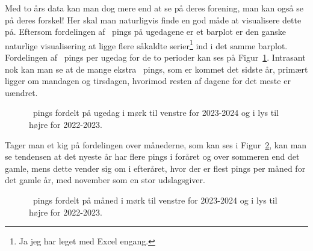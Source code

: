 \begin{article}
Med to års data kan man dog mere end at se på deres forening, man kan også se på deres forskel!
Her skal man naturligvis finde en god måde at visualisere dette på. Eftersom fordelingen af \coffee\ pings på ugedagene er et barplot er den ganske naturlige visualisering at ligge flere såkaldte serier\footnote{Ja jeg har leget med Excel engang.} ind i det samme barplot. Fordelingen af \coffee\ pings per ugedag for de to perioder kan ses på Figur~\ref{fig:weekday_analysis_side_by_side_2022-2023_2023-2024}. Intrasant nok kan man se at de mange ekstra \coffee\ pings, som er kommet det sidste år, primært ligger om mandagen og tirsdagen, hvorimod resten af dagene for det meste er uændret.

\begin{figure}[H]
	\centering
	\resizebox{\columnwidth}{!}{}
	\vspace{-25pt}
	\caption{\protect\coffee\ pings fordelt på ugedag i mørk til venstre for 2023-2024 og i lys til højre for 2022-2023.}
	\label{fig:weekday_analysis_side_by_side_2022-2023_2023-2024}
\end{figure}

Tager man et kig på fordelingen over månederne, som kan ses i Figur~\ref{fig:month_analysis_side_by_side_2022-2023_2023-2024}, kan man se tendensen at det nyeste år har flere pings i foråret og over sommeren end det gamle, mens dette vender sig om i efteråret, hvor der er flest pings per måned for det gamle år, med november som en stor udslagsgiver.

\begin{figure}[H]
	\centering
	\resizebox{\columnwidth}{!}{}
	\vspace{-25pt}
	\caption{\protect\coffee\ pings fordelt på måned i mørk til venstre for 2023-2024 og i lys til højre for 2022-2023.}
	\label{fig:month_analysis_side_by_side_2022-2023_2023-2024}
\end{figure}


\end{article}
